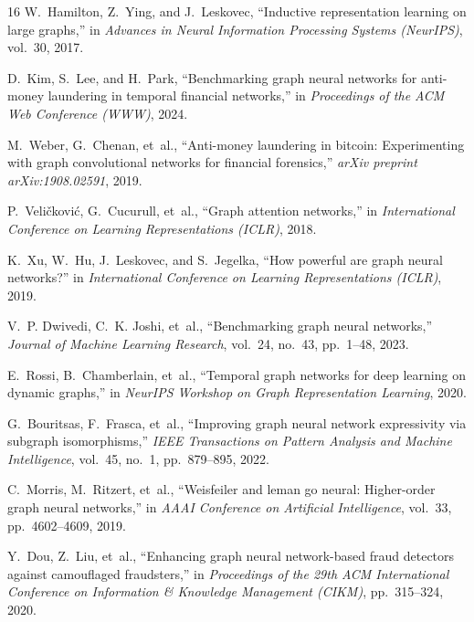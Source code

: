 \documentclass[10pt,twocolumn]{article}
\begin{document}
\begin{thebibliography}{16}
\small
{}
W.~Hamilton, Z.~Ying, and J.~Leskovec, ``Inductive representation learning on large graphs,'' in \textit{Advances in Neural Information Processing Systems (NeurIPS)}, vol.~30, 2017.

D.~Kim, S.~Lee, and H.~Park, ``Benchmarking graph neural networks for anti-money laundering in temporal financial networks,'' in \textit{Proceedings of the ACM Web Conference (WWW)}, 2024.

M.~Weber, G.~Chenan, et~al., ``Anti-money laundering in bitcoin: Experimenting with graph convolutional networks for financial forensics,'' \textit{arXiv preprint arXiv:1908.02591}, 2019.

P.~Veli{\v{c}}kovi{\'c}, G.~Cucurull, et~al., ``Graph attention networks,'' in \textit{International Conference on Learning Representations (ICLR)}, 2018.

K.~Xu, W.~Hu, J.~Leskovec, and S.~Jegelka, ``How powerful are graph neural networks?'' in \textit{International Conference on Learning Representations (ICLR)}, 2019.

V.~P. Dwivedi, C.~K. Joshi, et~al., ``Benchmarking graph neural networks,'' \textit{Journal of Machine Learning Research}, vol.~24, no.~43, pp.~1--48, 2023.

E.~Rossi, B.~Chamberlain, et~al., ``Temporal graph networks for deep learning on dynamic graphs,'' in \textit{NeurIPS Workshop on Graph Representation Learning}, 2020.

G.~Bouritsas, F.~Frasca, et~al., ``Improving graph neural network expressivity via subgraph isomorphisms,'' \textit{IEEE Transactions on Pattern Analysis and Machine Intelligence}, vol.~45, no.~1, pp.~879--895, 2022.

C.~Morris, M.~Ritzert, et~al., ``Weisfeiler and leman go neural: Higher-order graph neural networks,'' in \textit{AAAI Conference on Artificial Intelligence}, vol.~33, pp.~4602--4609, 2019.

Y.~Dou, Z.~Liu, et~al., ``Enhancing graph neural network-based fraud detectors against camouflaged fraudsters,'' in \textit{Proceedings of the 29th ACM International Conference on Information \& Knowledge Management (CIKM)}, pp.~315--324, 2020.


\end{thebibliography}
\end{document}
